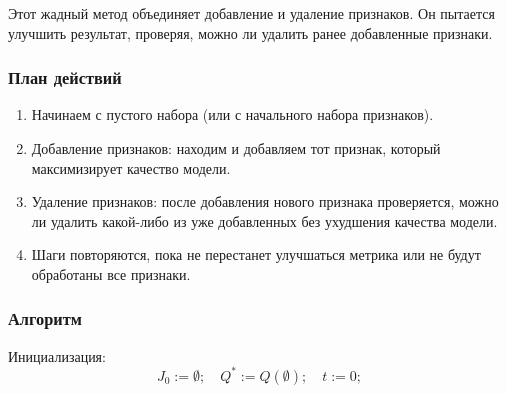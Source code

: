 Этот жадный метод объединяет добавление и удаление признаков. Он пытается улучшить результат, проверяя, можно ли удалить ранее добавленные признаки.

\subsubsection*{План действий}

\begin{enumerate}

\item Начинаем с пустого набора (или с начального набора признаков).

\item Добавление признаков: находим и добавляем тот признак, который максимизирует качество модели.

\item Удаление признаков: после добавления нового признака проверяется, можно ли удалить какой-либо из уже добавленных без ухудшения качества модели.

\item Шаги повторяются, пока не перестанет улучшаться метрика или не будут обработаны все признаки.

\end{enumerate}


\subsubsection*{Алгоритм}


Инициализация:
\[
J_0 := \emptyset; \quad Q^* := Q(\emptyset); \quad t := 0;
\]


